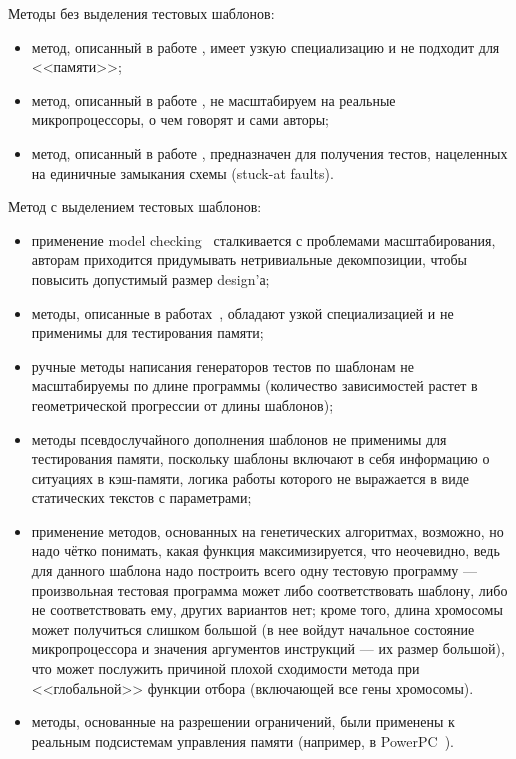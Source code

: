 \documentclass[14pt]{extreport}
\begin{document}
Методы без выделения тестовых шаблонов:
\begin{itemize}
	\item метод, описанный в работе \cite{Berkeley89}, имеет узкую специализацию и не подходит для <<памяти>>;
	\item метод, описанный в работе \cite{MishraDutt02}, не масштабируем на реальные микропроцессоры, о чем говорят и сами авторы;
	\item метод, описанный в работе \cite{microGP}, предназначен для получения тестов, нацеленных на единичные замыкания схемы (stuck-at faults).
\end{itemize}

Метод с выделением тестовых шаблонов:
\begin{itemize}
		\item применение model checking~\cite{MishraDutt04} сталкивается с проблемами масштабирования, авторам приходится придумывать нетривиальные декомпозиции, чтобы повысить допустимый размер design'а;
		\item методы, описанные в работах~\cite{MishraDutt05, Branches99}, обладают узкой специализацией и не применимы для тестирования памяти;
		\item ручные методы написания генераторов тестов по шаблонам не масштабируемы по длине программы (количество зависимостей растет в геометрической прогрессии от длины шаблонов);
		\item методы псевдослучайного дополнения шаблонов не применимы для тестирования памяти, поскольку шаблоны включают в себя информацию о ситуациях в кэш-памяти, логика работы которого  не выражается в виде статических текстов с параметрами;
		\item применение методов, основанных на генетических алгоритмах, возможно, но надо чётко понимать, какая функция максимизируется, что неочевидно, ведь для данного шаблона надо построить всего одну тестовую программу --- произвольная тестовая программа может либо соответствовать шаблону, либо не соответствовать ему, других вариантов нет; кроме того, длина хромосомы может получиться слишком большой (в нее войдут начальное состояние микропроцессора и значения аргументов  инструкций --- их размер большой), что может послужить причиной плохой сходимости метода при <<глобальной>> функции отбора (включающей все гены хромосомы).
		\item методы, основанные на разрешении ограничений, были применены к реальным подсистемам управления памяти (например, в PowerPC~\cite{GenesysPro}).
\end{itemize}
\end{document}
